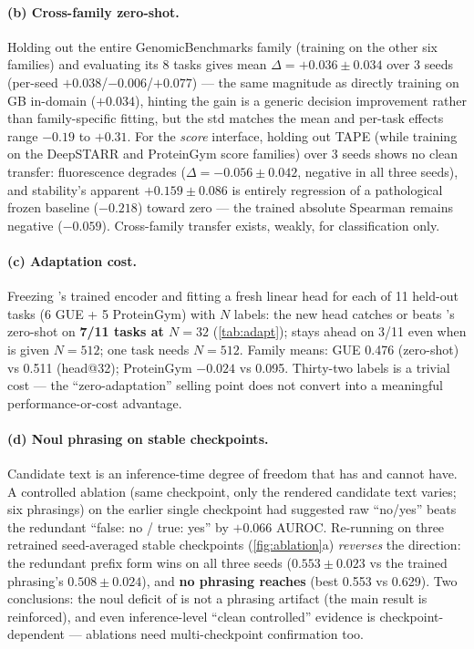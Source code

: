\paragraph{(b) Cross-family zero-shot.}
Holding out the entire GenomicBenchmarks family (training on the other six families) and
evaluating its 8 tasks gives mean $\Delta=+0.036\pm0.034$ over 3 seeds (per-seed
$+0.038$/$-0.006$/$+0.077$) --- the same magnitude as directly training on GB in-domain
($+0.034$), hinting the gain is a generic decision improvement rather than family-specific
fitting, but the std matches the mean and per-task effects range $-0.19$ to $+0.31$.
For the \emph{score} interface, holding out TAPE (while training on the DeepSTARR and
ProteinGym score families) over 3 seeds shows no clean transfer: fluorescence degrades
($\Delta=-0.056\pm0.042$, negative in all three seeds), and stability's apparent
$+0.159\pm0.086$ is entirely regression of a pathological frozen baseline ($-0.218$) toward
zero --- the trained absolute Spearman remains negative ($-0.059$). Cross-family transfer
exists, weakly, for classification only.

\paragraph{(c) Adaptation cost.}
Freezing 's trained encoder and fitting a fresh linear head for each of 11 held-out
tasks (6 GUE + 5 ProteinGym) with $N$ labels: the new head catches or beats 's
zero-shot on \textbf{7/11 tasks at $N=32$} (\cref{tab:adapt});  stays ahead on 3/11
even when  is given $N=512$; one task needs $N=512$. Family means: GUE 0.476
(zero-shot) vs 0.511 (head@32); ProteinGym $-0.024$ vs 0.095. Thirty-two labels is a trivial
cost --- the ``zero-adaptation'' selling point does not convert into a meaningful
performance-or-cost advantage.


\paragraph{(d) Noul phrasing on stable checkpoints.}
Candidate text is an inference-time degree of freedom that  has and  cannot
have. A controlled ablation (same checkpoint, only the rendered candidate text varies; six
phrasings) on the earlier single checkpoint had suggested raw ``no/yes'' beats the redundant
``false: no / true: yes'' by $+0.066$ AUROC. Re-running on three retrained seed-averaged
stable checkpoints (\cref{fig:ablation}a) \emph{reverses} the direction: the redundant
prefix form wins on all three seeds ($0.553\pm0.023$ vs the trained phrasing's
$0.508\pm0.024$), and \textbf{no phrasing reaches } (best 0.553 vs 0.629). Two
conclusions: the noul deficit of  is not a phrasing artifact (the main result is
reinforced), and even inference-level ``clean controlled'' evidence is checkpoint-dependent
--- ablations need multi-checkpoint confirmation too.

